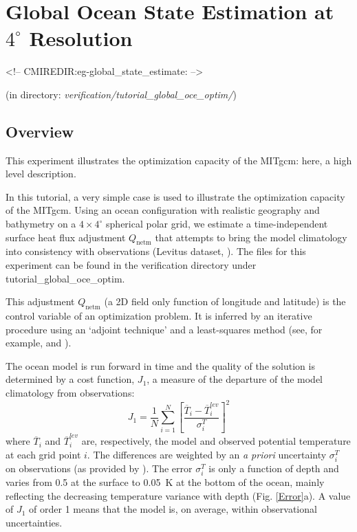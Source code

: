 
\section[Global Ocean State Estimation Example]{Global Ocean State Estimation at $4^\circ$ Resolution}
\label{www:tutorials}
\label{sect:eg-global_state_estimate}
\begin{rawhtml}
<!-- CMIREDIR:eg-global_state_estimate: -->
\end{rawhtml}
\begin{center}
(in directory: {\it verification/tutorial\_global\_oce\_optim/})
\end{center}

\subsection{Overview}

This experiment illustrates the optimization capacity of the MITgcm: here,
a high level description.

In this tutorial, a very simple case is used to illustrate the optimization
capacity of the MITgcm. Using an ocean configuration with realistic geography
and bathymetry on a $4\times4^\circ$ spherical polar grid, we estimate a
time-independent surface heat flux adjustment $Q_\mathrm{netm}$ that attempts
to bring the model climatology into consistency with observations (Levitus
dataset, \cite{lev:94a}). The files for this experiment can be found in the
verification directory under tutorial\_global\_oce\_optim.

This adjustment $Q_\mathrm{netm}$ (a 2D field only function of longitude and
latitude) is the control variable of an optimization problem. It is inferred
by an iterative procedure using an `adjoint technique' and a least-squares
method (see, for example, \cite{stam-etal:02} and \cite{fer-eta:05}).

The ocean model is run forward in time and the quality of the solution is
determined by a cost function, $J_1$, a measure of the departure of the model
climatology from observations:
\begin{equation}\label{cost_temp}
J_1=\frac{1}{N}\sum_{i=1}^N \left[ \frac{\overline{T}_i-\overline{T}_i^{lev}}{\sigma_i^T}\right]^2
\end{equation}
where $\overline{T}_i$ and $\overline{T}_i^{lev}$ are, respectively, the model
and observed potential temperature at each
grid point $i$. The differences are weighted by an {\it a priori} uncertainty
$\sigma_i^T$ on observations (as provided by \cite{lev:94a}). The error
$\sigma_i^T$ is only a function of depth and varies from 0.5 at the surface to
0.05~K at the bottom of the ocean, mainly reflecting the decreasing
temperature variance with depth (Fig. \ref{Error}a). A value of $J_1$ of
order 1 means that the model is, on average, within observational
uncertainties.

